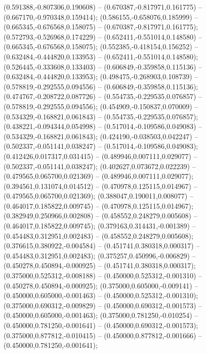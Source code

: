  (0.591388,-0.807306,0.190608) -- (0.670387,-0.817971,0.161775) -- (0.667170,-0.970348,0.159414);
 (0.586155,-0.658076,0.185999) -- (0.665345,-0.676568,0.158075) -- (0.670387,-0.817971,0.161775);
 (0.572793,-0.526968,0.174229) -- (0.652411,-0.551014,0.148580) -- (0.665345,-0.676568,0.158075);
 (0.552385,-0.418154,0.156252) -- (0.632484,-0.444820,0.133953) -- (0.652411,-0.551014,0.148580);
 (0.526445,-0.333608,0.133403) -- (0.606849,-0.359858,0.115136) -- (0.632484,-0.444820,0.133953);
 (0.498475,-0.268903,0.108739) -- (0.578819,-0.292555,0.094556) -- (0.606849,-0.359858,0.115136);
 (0.474767,-0.208722,0.087726) -- (0.554735,-0.229535,0.076857) -- (0.578819,-0.292555,0.094556);
 (0.454909,-0.150837,0.070009) -- (0.534329,-0.168821,0.061843) -- (0.554735,-0.229535,0.076857);
 (0.438221,-0.094344,0.054998) -- (0.517014,-0.109586,0.049083) -- (0.534329,-0.168821,0.061843);
 (0.424190,-0.038503,0.042247) -- (0.502337,-0.051141,0.038247) -- (0.517014,-0.109586,0.049083);
 (0.412426,0.017317,0.031415) -- (0.489946,0.007111,0.029077) -- (0.502337,-0.051141,0.038247);
 (0.402627,0.073672,0.022239) -- (0.479565,0.065700,0.021369) -- (0.489946,0.007111,0.029077);
 (0.394561,0.131074,0.014512) -- (0.470978,0.125115,0.014967) -- (0.479565,0.065700,0.021369);
 (0.388047,0.190011,0.008077) -- (0.464017,0.185822,0.009745) -- (0.470978,0.125115,0.014967);
 (0.382949,0.250966,0.002808) -- (0.458552,0.248279,0.005608) -- (0.464017,0.185822,0.009745);
 (0.379163,0.314431,-0.001389) -- (0.454483,0.312951,0.002483) -- (0.458552,0.248279,0.005608);
 (0.376615,0.380922,-0.004584) -- (0.451741,0.380318,0.000317) -- (0.454483,0.312951,0.002483);
 (0.375257,0.450996,-0.006829) -- (0.450278,0.450894,-0.000925) -- (0.451741,0.380318,0.000317);
 (0.375000,0.525312,-0.008188) -- (0.450000,0.525312,-0.001310) -- (0.450278,0.450894,-0.000925);
 (0.375000,0.605000,-0.009141) -- (0.450000,0.605000,-0.001463) -- (0.450000,0.525312,-0.001310);
 (0.375000,0.690312,-0.009829) -- (0.450000,0.690312,-0.001573) -- (0.450000,0.605000,-0.001463);
 (0.375000,0.781250,-0.010254) -- (0.450000,0.781250,-0.001641) -- (0.450000,0.690312,-0.001573);
 (0.375000,0.877812,-0.010415) -- (0.450000,0.877812,-0.001666) -- (0.450000,0.781250,-0.001641);
